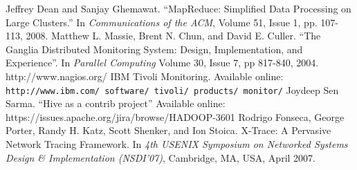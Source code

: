 \documentclass[letterpaper,twocolumn,10pt]{article}
\begin{document}
\begin{thebibliography}{99}

Jeffrey Dean and Sanjay Ghemawat. ``MapReduce: Simplified Data Processing on Large Clusters.'' \newblock In \textit{Communications of the ACM}, Volume 51, Issue 1, pp. 107-113, 2008.
Matthew L. Massie, Brent N. Chun, and David E. Culler.  ``The Ganglia Distributed Monitoring System: Design, Implementation, and Experience''.
\newblock In \textit{Parallel Computing} Volume 30, Issue 7, pp 817-840, 2004.
http://www.nagios.org/
IBM Tivoli Monitoring.
\newblock Available online: \texttt{http://www.ibm.com/ software/ tivoli/ products/ monitor/}
Joydeep Sen Sarma.  ``Hive as a contrib project''
\newblock Available online: https://issues.apache.org/jira/browse/HADOOP-3601
Rodrigo Fonseca, George Porter, Randy H. Katz, Scott Shenker, and Ion Stoica.  X-Trace: A Pervasive Network Tracing Framework.
\newblock In \textit{4th USENIX Symposium on Networked Systems Design \& Implementation (NSDI'07)}, Cambridge, MA, USA, April 2007.
\end{thebibliography}
\end{document}
